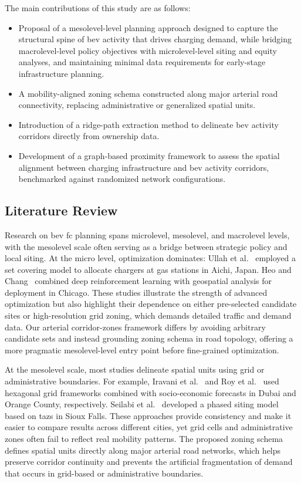 The main contributions of this study are as follows:

\begin{itemize}
\item Proposal of a \gls{mesolevel}-level planning approach designed to capture the structural spine of \gls{bev} activity that drives charging demand, while bridging \gls{macrolevel}-level policy objectives with \gls{microlevel}-level siting and equity analyses, and maintaining minimal data requirements for early-stage infrastructure planning.
\item A mobility-aligned zoning schema constructed along major arterial road connectivity, replacing administrative or generalized spatial units. 

\item Introduction of a ridge-path extraction method to delineate \gls{bev} activity corridors directly from ownership data.

 \item Development of a graph-based proximity framework to assess the spatial alignment between charging infrastructure and \gls{bev} activity corridors, benchmarked against randomized network configurations. 

 \end{itemize}
\subsection{Literature Review}

Research on \gls{bev} \gls{fc} planning spans \gls{microlevel}, \gls{mesolevel}, and \gls{macrolevel} levels, with the \gls{mesolevel} scale often serving as a bridge between strategic policy and local siting. At the micro level, optimization dominates: Ullah et al.~\cite{ullah2023} employed a set covering model to allocate chargers at gas stations in Aichi, Japan. Heo and Chang~\cite{HEO2024} combined deep reinforcement learning with geospatial analysis for deployment in Chicago. These studies illustrate the strength of advanced optimization but also highlight their dependence on either pre-selected candidate sites or high-resolution grid zoning, which demands detailed traffic and demand data. Our arterial corridor-zones framework differs by avoiding arbitrary candidate sets and instead grounding zoning schema in road topology, offering a more pragmatic \gls{mesolevel}-level entry point before fine-grained optimization.  

At the \gls{mesolevel} scale, most studies delineate spatial units using grid or administrative boundaries. For example, Iravani et al.~\cite{IRAVANI2022} and Roy et al.~\cite{ROY2022} used hexagonal grid frameworks combined with socio-economic forecasts in Dubai and Orange County, respectively. Seilabi et al.~\cite{Seilabi2025} developed a phased siting model based on \glspl{taz} in Sioux Falls. These approaches provide consistency and make it easier to compare results across different cities, yet grid cells and administrative zones often fail to reflect real mobility patterns. The proposed zoning schema defines spatial units directly along major arterial road networks, which helps preserve corridor continuity and prevents the artificial fragmentation of demand that occurs in grid-based or administrative boundaries.


